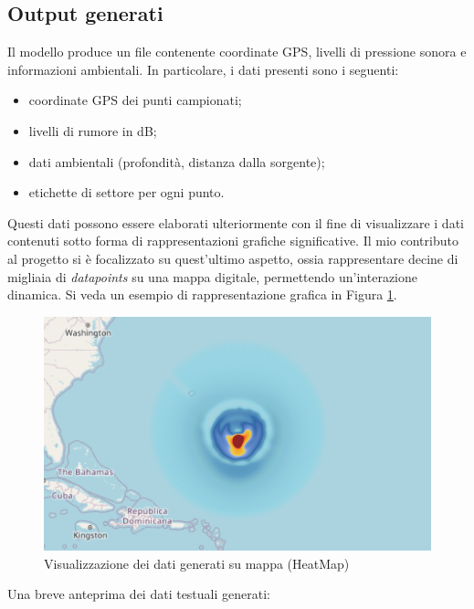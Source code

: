 \subsection{Output generati}

Il modello produce un file contenente coordinate GPS, livelli di pressione sonora e informazioni ambientali. In particolare, i dati presenti sono i seguenti:

\begin{itemize}
  \item coordinate GPS dei punti campionati;
  \item livelli di rumore in dB;
  \item dati ambientali (profondità, distanza dalla sorgente);
  \item etichette di settore per ogni punto.
\end{itemize}

Questi dati possono essere elaborati ulteriormente con il fine di visualizzare i dati contenuti sotto forma di rappresentazioni grafiche significative. Il mio contributo al progetto si è focalizzato su quest'ultimo aspetto, ossia rappresentare decine di migliaia di \textit{datapoints} su una mappa digitale, permettendo un'interazione dinamica. Si veda un esempio di rappresentazione grafica in Figura \ref{fig:preview-heatmap}.

\begin{figure}
    \centering
    \includegraphics[width=0.75\linewidth]{images/heatmap.png}
    \caption{Visualizzazione dei dati generati su mappa (HeatMap)}
    \label{fig:preview-heatmap}
\end{figure}

Una breve anteprima dei dati testuali generati:

